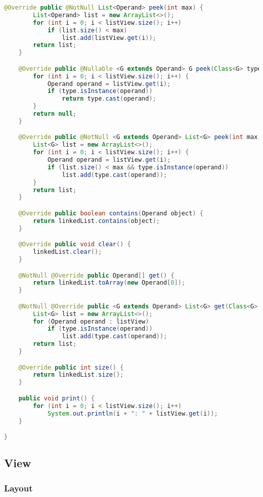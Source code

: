 \begin{lstlisting}[caption=OperandStack (Schwenke),label=list:OperandStack,language=Java]
    @Override public @NotNull List<Operand> peek(int max) {
        List<Operand> list = new ArrayList<>();
        for (int i = 0; i < listView.size(); i++)
            if (list.size() < max)
                list.add(listView.get(i));
        return list;
    }

    @Override public @Nullable <G extends Operand> G peek(Class<G> type) {
        for (int i = 0; i < listView.size(); i++) {
            Operand operand = listView.get(i);
            if (type.isInstance(operand))
                return type.cast(operand);
        }
        return null;
    }

    @Override public @NotNull <G extends Operand> List<G> peek(int max, Class<G> type) {
        List<G> list = new ArrayList<>();
        for (int i = 0; i < listView.size(); i++) {
            Operand operand = listView.get(i);
            if (list.size() < max && type.isInstance(operand))
                list.add(type.cast(operand));
        }
        return list;
    }

    @Override public boolean contains(Operand object) {
        return linkedList.contains(object);
    }

    @Override public void clear() {
        linkedList.clear();
    }

    @NotNull @Override public Operand[] get() {
        return linkedList.toArray(new Operand[0]);
    }

    @NotNull @Override public <G extends Operand> List<G> get(Class<G> type) {
        List<G> list = new ArrayList<>();
        for (Operand operand : listView)
            if (type.isInstance(operand))
                list.add(type.cast(operand));
        return list;
    }

    @Override public int size() {
        return linkedList.size();
    }

    public void print() {
        for (int i = 0; i < listView.size(); i++)
            System.out.println(i + ": " + listView.get(i));
    }

}

\end{lstlisting} 

\subsection{View}

\subsubsection{Layout}

